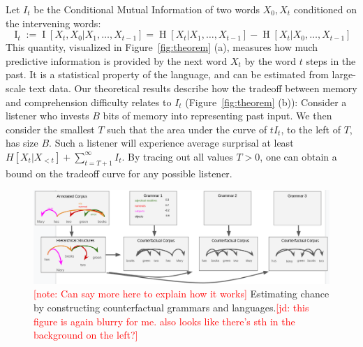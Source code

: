 \documentclass[12pt]{article}
\newcounter{theorem}
\newcommand{\jd}[1]{\textcolor{Red}{[jd: #1]}}
\newcommand{\note}[1]{\textcolor{Red}{[note: #1]}}
\begin{document}
Let $I_t$ be the Conditional Mutual Information of two words $X_0, X_t$ conditioned on the intervening words:
\begin{equation}
	\operatorname{I}_t := \operatorname{I}[X_t, X_0 | X_1, \dots, X_{t-1}] = \operatorname{H}[X_t|X_1, \dots, X_{t-1}] - \operatorname{H}[X_t|X_0, \dots, X_{t-1}] 
\end{equation}
This quantity, visualized in Figure~\ref{fig:theorem} (a), measures how much predictive information is provided by the next word $X_t$ by the word $t$ steps in the past.
It is a statistical property of the language, and can be estimated from large-scale text data.
Our theoretical results describe how the tradeoff between memory and comprehension difficulty relates to $I_t$ (Figure~\ref{fig:theorem} (b)):
Consider a listener who invests $B$ bits of memory into representing past input.
We then consider the smallest $T$ such that the area under the curve of $t I_t$, to the left of $T$, has size $B$.
Such a listener will experience average surprisal at least $H[X_t| X_{<t}] + \sum_{t=T+1}^\infty I_t$. %
By tracing out all values $T >0$, one can obtain a bound on the tradeoff curve for any possible listener.
%
%







\begin{figure}
\centering
\includegraphics[width=\textwidth]{figures-gdrive/counterfactual-languages.png}
	\caption{\note{Can say more here to explain how it works} Estimating chance by constructing counterfactual grammars and languages.\jd{this figure is again blurry for me. also looks like there's sth in the background on the left?}}\label{fig:grammars}
\end{figure}
\end{document}
